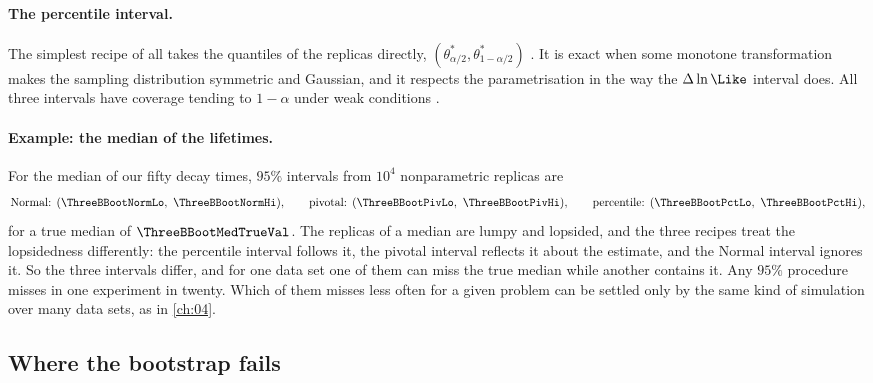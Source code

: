 \paragraph{The percentile interval.}
The simplest recipe of all takes the quantiles of the replicas directly,
$(\theta^*_{\alpha/2},\theta^*_{1-\alpha/2})$ . It is exact
when some monotone transformation makes the sampling distribution symmetric
and Gaussian, and it respects the parametrisation in the way the
$\Delta\ln\Like$ interval does. All three intervals have coverage tending to
$1-\alpha$ under weak conditions .

\paragraph{Example: the median of the lifetimes.}
For the median of our fifty decay times, $95\%$ intervals from $10^4$
nonparametric replicas are
\[
  \text{Normal: }(\ThreeBBootNormLo,\ \ThreeBBootNormHi),\qquad
  \text{pivotal: }(\ThreeBBootPivLo,\ \ThreeBBootPivHi),\qquad
  \text{percentile: }(\ThreeBBootPctLo,\ \ThreeBBootPctHi),
\]
for a true median of $\ThreeBBootMedTrueVal$. The replicas of a median are
lumpy and lopsided, and the three recipes treat the lopsidedness
differently: the percentile interval follows it, the pivotal interval
reflects it about the estimate, and the Normal interval ignores it. So the
three intervals differ, and for one data set one of them can miss the true
median while another contains it. Any $95\%$ procedure
misses in one experiment in twenty. Which of them misses less often for a
given problem can be settled only by the same kind of simulation over many
data sets, as in \cref{ch:04}.

\subsection{Where the bootstrap fails}
\label{3b:sec:boot-fail}

